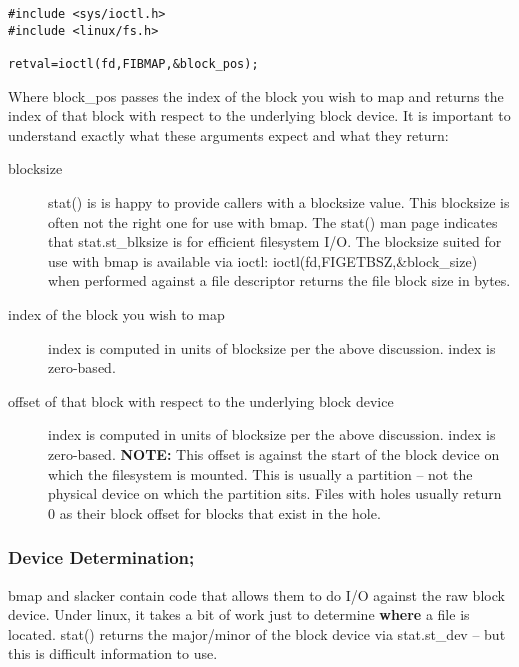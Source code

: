 \documentclass[letterpaper]{article}
\begin{document}
\begin{verbatim}
#include <sys/ioctl.h>
#include <linux/fs.h>

retval=ioctl(fd,FIBMAP,&block_pos);
\end{verbatim}




Where {\ttfamily block\_pos} passes the index of the block you wish to
map and returns the index of that block with respect to the underlying
block device. It is important to understand exactly what these arguments
expect and what they return:
\begin{description}
\item[blocksize] \mbox{}

{\ttfamily stat()} is is happy to provide callers with a
blocksize value. This blocksize is often not the right one
for use with bmap. The {\ttfamily stat()} man page indicates
that {\ttfamily stat.st\_blksize} is for efficient filesystem I/O.
The blocksize suited for use with bmap is available via 
ioctl: {\ttfamily ioctl(fd,FIGETBSZ,\&block\_size)} when
performed against a file descriptor returns the file
block size in bytes.



\item[index of the block you wish to map] \mbox{}

index is computed in units of blocksize per the
above discussion. index is zero-based.



\item[offset of that block with respect to the underlying block device] \mbox{}

index is computed in units of blocksize per the above
discussion. index is zero-based. {\bfseries NOTE:} This offset
is against the start of the block device on which the
filesystem is mounted. This is usually a partition -- not
the physical device on which the partition sits.
Files with holes usually return 0 as their block offset for
blocks that exist in the hole.

\end{description}





\subsubsection{Device Determination;}

{\ttfamily bmap} and {\ttfamily slacker} contain code that allows them to 
do I/O against the raw block device. Under linux, it takes
a bit of work just to determine {\bfseries where} a file is located.
{\ttfamily stat()} returns the major/minor of the block device via
{\ttfamily stat.st\_dev} -- but this is difficult information to use.
\end{document}
